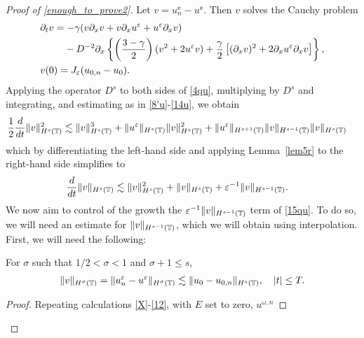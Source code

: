 \begin{proof}[Proof of \eqref{enough_to_prove2}] Let $v = u^\ee_n - u^\ee$. Then 
$v$ solves the Cauchy problem
\begin{align}
\label{4qu}
& \p_t v  =  -\gamma (v \p_x v + v \p_x u^\ee + u^\ee \p_x v)  \\
& \phantom{\p_t v  =} - D^{-2} \p_x \left\{\left (\frac{3-\gamma}{2} \right )(v^2 +
2u^\ee v) + \frac{\gamma}{2}\left[ (\p_x v)^2 + 2 \p_x u^\ee \p_x v \right]
\right\}, \notag
\\
& v(0) =J_\ee(u_{0,n} - u_0).
\label{5qu}
\end{align}
Applying the operator $D^s$ to both sides of \eqref{4qu}, multiplying by
$D^s$ and integrating, and estimating as in \eqref{8'u}-\eqref{14u}, we 
obtain
%
%
\begin{equation*}
\begin{split}
\frac{1}{2}\frac{d}{dt}\|v\|_{H^{s}(\mathbb{T})}^2
& \lesssim \|v\|_{H^s(\mathbb{T})}^3 + \|u^\varepsilon\|_{H^s(\mathbb{T})}
\|v\|_{H^s(\mathbb{T})}^2
 + \|u^\varepsilon\|_{H^{s+1}(\mathbb{T})}
\|v\|_{H^{s-1}(\mathbb{T})} \|v\|_{H^s(\mathbb{T})}
\end{split}
\end{equation*}
%
%
which by differentiating the left-hand side and applying Lemma~\ref{lem5r} to 
the right-hand side simplifies to
\begin{equation}
\begin{split}
\frac{d}{dt}\|v\|_{H^{s}(\mathbb{T})}
& \lesssim \|v\|_{H^s(\mathbb{T})}^2 + \|v\|_{H^s(\mathbb{T})}
+ \varepsilon^{-1}
\|v\|_{H^{s-1}(\mathbb{T})}.
\label{15qu}
\end{split}
\end{equation}
%
%
We now aim to control of the growth the $\varepsilon^{-1}
\|v\|_{H^{s-1}(\mathbb{T})}$ term of \eqref{15qu}. To do so, we will need an estimate for
$\|v\|_{H^{s-1}(\mathbb{T})}$, which we will obtain using interpolation. First, 
we will need the following:
%
%
%
%
\begin{proposition}
\label{prop:left}
For $\sigma$ such that $1/2 < \sigma < 1$ and $\sigma + 1 \le s$, 
%
%
\begin{equation}
\label{prop:6rq}
\begin{split}
\|v\|_{H^{\sigma}(\mathbb{T})} = \|u^\varepsilon_n - u^\varepsilon\|_{H^\sigma(\mathbb{T})}
\lesssim \|u_0 - u_{0,n} \|_{H^s(\mathbb{T})}, \quad |t| \le T.
\end{split}
\end{equation}
%
%
\end{proposition}
%
%
%
\begin{proof}
Repeating calculations \eqref{X}-\eqref{12}, with $E$ set to zero, 
$u^{\omega,n}$

\end{proof}
\end{proof}
